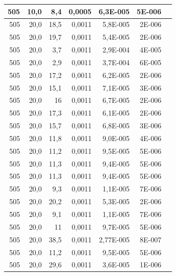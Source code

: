 \documentclass[12pt]{scrartcl}
\begin{document}
\begin{table}[H]
\begin{center}
\begin{tabular}{|r|r|r|r|r|r|r|}
505 & 10,0 & 8,4 & 0,0005  & 6,3E-005 & 5E-006 \\ \hline
505 & 20,0 & 18,5 & 0,0011  & 5,8E-005 & 2E-006 \\ \hline
505 & 20,0 & 19,7 & 0,0011  & 5,4E-005 & 2E-006 \\ \hline
505 & 20,0 & 3,7 & 0,0011  & 2,9E-004 & 4E-005 \\ \hline
505 & 20,0 & 2,9 & 0,0011  & 3,7E-004 & 6E-005 \\ \hline
505 & 20,0 & 17,2 & 0,0011  & 6,2E-005 & 2E-006 \\ \hline
505 & 20,0 & 15,1 & 0,0011  & 7,1E-005 & 3E-006 \\ \hline
505 & 20,0 & 16 & 0,0011  & 6,7E-005 & 2E-006 \\ \hline
505 & 20,0 & 17,3 & 0,0011  & 6,1E-005 & 2E-006 \\ \hline
505 & 20,0 & 15,7 & 0,0011  & 6,8E-005 & 3E-006 \\ \hline
505 & 20,0 & 11,8 & 0,0011  & 9,0E-005 & 4E-006 \\ \hline
505 & 20,0 & 11,2 & 0,0011  & 9,5E-005 & 5E-006 \\ \hline
505 & 20,0 & 11,3 & 0,0011  & 9,4E-005 & 5E-006 \\ \hline
505 & 20,0 & 11,3 & 0,0011  & 9,4E-005 & 5E-006 \\ \hline
505 & 20,0 & 9,3 & 0,0011  & 1,1E-005 & 7E-006 \\ \hline
505 & 20,0 & 20,2 & 0,0011  & 5,3E-005 & 2E-006 \\ \hline
505 & 20,0 & 9,1 & 0,0011  & 1,1E-005 & 7E-006 \\ \hline
505 & 20,0 & 11 & 0,0011  & 9,7E-005 & 5E-006 \\ \hline
505 & 20,0 & 38,5 & 0,0011  & 2,77E-005 & 8E-007 \\ \hline
505 & 20,0 & 11,2 & 0,0011  & 9,5E-005 & 5E-006 \\ \hline
505 & 20,0 & 29,6 & 0,0011  & 3,6E-005 & 1E-006 \\ \hline
\end{tabular}
\end{center}
\label{tab:messwerte_1}
\end{table}
\end{document}
